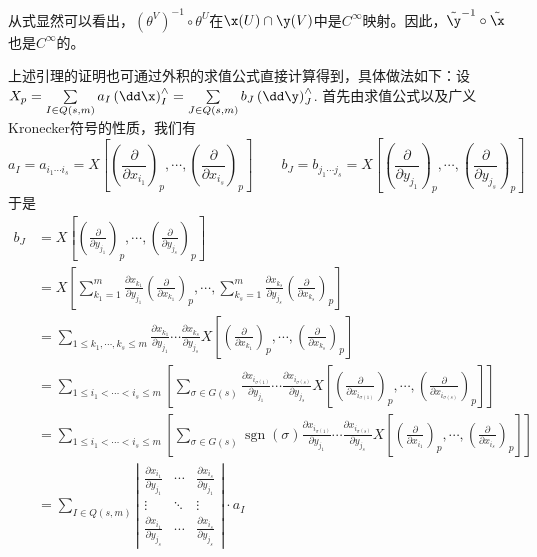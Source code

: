 从式显然可以看出，$(\theta^{V})^{-1}\circ \theta^{U}$在$\x(U)\cap \y(V)$中是$C^{\infty}$映射。因此，$\tilde{\y}^{-1}\circ \tilde{\x}$也是$C^{\infty}$的。

\begin{remark}
	上述引理的证明也可通过外积的求值公式直接计算得到，具体做法如下：设$X_{p}=\sum\limits_{I\in Q(s,m)}a_{I}\left( \dd\x \right)^{\wedge}_{I}=\sum\limits_{J\in Q(s,m)}b_{J}\left( \dd\y \right)^{\wedge}_{J}$. 首先由求值公式以及广义Kronecker符号的性质，我们有
	\[
	a_{I}=a_{i_{1}\cdots i_{s}}=X \left[ \left( \frac { \partial  } { \partial x_{i_{1}}} \right)_{p},\cdots,\left( \frac { \partial  } { \partial x_{i_{s}}} \right)_{p} \right]\quad\quad b_{J}=b_{j_{1}\cdots j_{s}}=X \left[ \left( \frac { \partial  } { \partial y_{j_{1}}} \right)_{p},\cdots,\left( \frac { \partial  } { \partial y_{j_{s}}} \right)_{p} \right]
	\]
	于是
	\[
	\begin{split}
	b_{J}&=X \left[ \left( \frac { \partial  } { \partial y_{j_{1}}} \right)_{p},\cdots,\left( \frac { \partial  } { \partial y_{j_{s}}} \right)_{p} \right]\\
	&=X \left[  \sum_{k_{1}=1}^{m}\frac { \partial x_{k_{1}} } { \partial y_{j_{1}}}\left( \frac { \partial  } { \partial x_{k_{1}}} \right)_{p},\cdots, \sum_{k_{s}=1}^{m}\frac { \partial x_{k_{s}} } { \partial y_{j_{s}}}\left( \frac { \partial  } { \partial x_{k_{s}}} \right)_{p} \right]\\
	&=\sum_{1\leqslant k_{1},\cdots,k_{s}\leqslant m}\frac { \partial x_{k_{1}} } { \partial y_{j_{1}}}\cdots \frac { \partial x_{k_{s}} } { \partial y_{j_{s}}} X \left[ \left( \frac { \partial  } { \partial x_{k_{1}}} \right)_{p},\cdots,\left( \frac { \partial  } { \partial x_{k_{s}}} \right)_{p} \right]\\
	&=\sum_{1\leqslant i_{1}<\cdots<i_{s}\leqslant m}\left[\sum_{\sigma\in G(s)} \frac { \partial x_{i_{\sigma(1)}} } { \partial y_{j_{1}}}\cdots \frac { \partial x_{i_{\sigma(s)}} } { \partial y_{j_{s}}} X \left[ \left( \frac { \partial  } { \partial x_{i_{\sigma(1)}}} \right)_{p},\cdots,\left( \frac { \partial  } { \partial x_{i_{\sigma(s)}}} \right)_{p} \right]\right]\\
	&=\sum_{1\leqslant i_{1}<\cdots<i_{s}\leqslant m}\left[\sum_{\sigma\in G(s)}\operatorname{sgn}(\sigma) \frac { \partial x_{i_{\sigma(1)}} } { \partial y_{j_{1}}}\cdots \frac { \partial x_{i_{\sigma(s)}} } { \partial y_{j_{s}}} X \left[ \left( \frac { \partial  } { \partial x_{i_{1}}} \right)_{p},\cdots,\left( \frac { \partial  } { \partial x_{i_{s}}} \right)_{p} \right]\right]\\
	&=\sum_{I\in Q(s,m)}
		\left| \begin{array}{ccc}{\frac { \partial x_{i_{1}} } { \partial y _ { j_{1} } } }  & {\cdots} & {\frac { \partial x_{i_{s}} } { \partial y _ { j_{1} } } }  \\ {\vdots}  & { \ddots} & {\vdots} \\ {\frac { \partial x_{i_{1}} } { \partial y _ { j_{s} } } }  & {\cdots} & {\frac { \partial x_{i_{s}} } { \partial y _ { j_{s} } } }\end{array}\right|\cdot a_{I}
	\end{split}
	\]
\end{remark}

